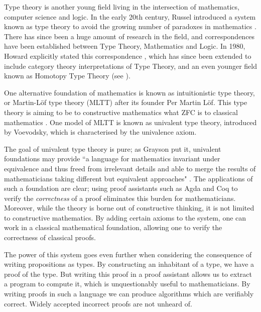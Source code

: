 \documentclass[ProjectReport]{subfiles}
\begin{document}
Type theory is another young field living in the intersection of mathematics, computer science and logic. In the early 20th century, Russel introduced a system known as type theory to avoid the growing number of paradoxes in mathematics \cite{coquand_type_2018}. There has since been a huge amount of research in the field, and correspondences have been established between Type Theory, Mathematics and Logic. In 1980, Howard explicitly stated this correspondence \cite{Howard1980-HOWTFN-2}, which has since been extended to include category theory interpretations of Type Theory, and an even younger field known as Homotopy Type Theory (see \cite{hottbook}). 

One alternative foundation of mathematics is known as intuitionistic type theory, or Martin-L\"{o}f type theory (MLTT) after its founder Per Martin L\"{o}f. This type theory is aiming to be to constructive mathematics what ZFC is to classical mathematics \cite{dybjer_intuitionistic_2020}. One model of MLTT is known as univalent type theory, introduced by Voevodsky, which is characterised by the univalence axiom. 

The goal of univalent type theory is pure; as Grayson put it, univalent foundations may provide ``a language for mathematics invariant under equivalence and thus freed from irrelevant details and able to merge the results of mathematicians taking different but equivalent approaches" \cite{grayson_introduction_2018}. The applications of such a foundation are clear; using proof assistants such as Agda and Coq to verify the \textit{correctness} of a proof eliminates this burden for mathematicians. Moreover, while the theory is borne out of constructive thinking, it is not limited to constructive mathematics. By adding certain axioms to the system, one can work in a classical mathematical foundation, allowing one to verify the correctness of classical proofs. 

The power of this system goes even further when considering the consequence of writing propositions as types. By constructing an inhabitant of a type, we have a proof of the type. But writing this proof in a proof assistant allows us to extract a program to compute it, which is unquestionably useful to mathematicians. By writing proofs in such a language we can produce algorithms which are verifiably correct. Widely accepted incorrect proofs \cite{Incorrect_Proofs} are not unheard of.
\end{document}
